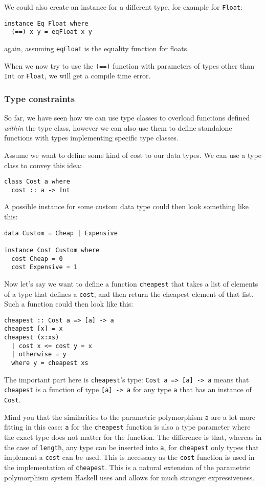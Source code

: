 We could also create an instance for a different type, for example for \verb|Float|:
\begin{verbatim}
instance Eq Float where
  (==) x y = eqFloat x y
\end{verbatim}
again, assuming \verb|eqFloat| is the equality function for floats.

When we now try to use the \verb|(==)| function with parameters of types other than \verb|Int| or \verb|Float|, we will get a compile time error.

\subsubsection{Type constraints}\label{constraints}

So far, we have seen how we can use type classes to overload functions defined \textit{within} the type class, however we can also use them to define standalone functions with types implementing specific type classes.

Assume we want to define some kind of cost to our data types. We can use a type class to convey this idea:
\begin{verbatim}
class Cost a where
  cost :: a -> Int
\end{verbatim}
A possible instance for some custom data type could then look something like this:
\begin{verbatim}
data Custom = Cheap | Expensive

instance Cost Custom where
  cost Cheap = 0
  cost Expensive = 1
\end{verbatim}

Now let's say we want to define a function \verb|cheapest| that takes a list of elements of a type that defines a \verb|cost|, and then return the cheapest element of that list. Such a function could then look like this:
\begin{verbatim}
cheapest :: Cost a => [a] -> a
cheapest [x] = x
cheapest (x:xs)
  | cost x <= cost y = x
  | otherwise = y
  where y = cheapest xs
\end{verbatim}
The important part here is \verb|cheapest|'s type: \verb|Cost a => [a] -> a| means that \verb|cheapest| is a function of type \verb|[a] -> a| for any type \verb|a| that has an instance of \verb|Cost|.

Mind you that the similarities to the parametric polymorphism \verb|a| are a lot more fitting in this case: \verb|a| for the \verb|cheapest| function is also a type parameter where the exact type does not matter for the function. The difference is that, whereas in the case of \verb|length|, any type can be inserted into \verb|a|, for \verb|cheapest| only types that implement a \verb|cost| can be used. This is necessary as the \verb|cost| function is used in the implementation of \verb|cheapest|. This is a natural extension of the parametric polymorphism system Haskell uses and allows for much stronger expressiveness.

